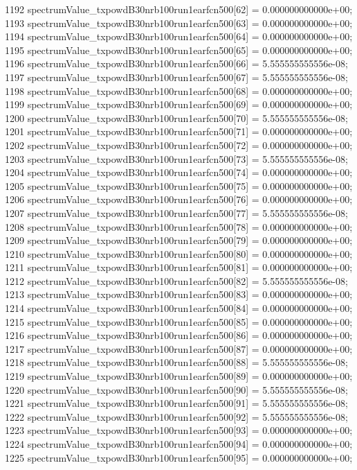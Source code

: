\begin{DoxyCode}
1192   spectrumValue\_txpowdB30nrb100run1earfcn500[62] = 0.000000000000e+00;
1193   spectrumValue\_txpowdB30nrb100run1earfcn500[63] = 0.000000000000e+00;
1194   spectrumValue\_txpowdB30nrb100run1earfcn500[64] = 0.000000000000e+00;
1195   spectrumValue\_txpowdB30nrb100run1earfcn500[65] = 0.000000000000e+00;
1196   spectrumValue\_txpowdB30nrb100run1earfcn500[66] = 5.555555555556e-08;
1197   spectrumValue\_txpowdB30nrb100run1earfcn500[67] = 5.555555555556e-08;
1198   spectrumValue\_txpowdB30nrb100run1earfcn500[68] = 0.000000000000e+00;
1199   spectrumValue\_txpowdB30nrb100run1earfcn500[69] = 0.000000000000e+00;
1200   spectrumValue\_txpowdB30nrb100run1earfcn500[70] = 5.555555555556e-08;
1201   spectrumValue\_txpowdB30nrb100run1earfcn500[71] = 0.000000000000e+00;
1202   spectrumValue\_txpowdB30nrb100run1earfcn500[72] = 0.000000000000e+00;
1203   spectrumValue\_txpowdB30nrb100run1earfcn500[73] = 5.555555555556e-08;
1204   spectrumValue\_txpowdB30nrb100run1earfcn500[74] = 0.000000000000e+00;
1205   spectrumValue\_txpowdB30nrb100run1earfcn500[75] = 0.000000000000e+00;
1206   spectrumValue\_txpowdB30nrb100run1earfcn500[76] = 0.000000000000e+00;
1207   spectrumValue\_txpowdB30nrb100run1earfcn500[77] = 5.555555555556e-08;
1208   spectrumValue\_txpowdB30nrb100run1earfcn500[78] = 0.000000000000e+00;
1209   spectrumValue\_txpowdB30nrb100run1earfcn500[79] = 0.000000000000e+00;
1210   spectrumValue\_txpowdB30nrb100run1earfcn500[80] = 0.000000000000e+00;
1211   spectrumValue\_txpowdB30nrb100run1earfcn500[81] = 0.000000000000e+00;
1212   spectrumValue\_txpowdB30nrb100run1earfcn500[82] = 5.555555555556e-08;
1213   spectrumValue\_txpowdB30nrb100run1earfcn500[83] = 0.000000000000e+00;
1214   spectrumValue\_txpowdB30nrb100run1earfcn500[84] = 0.000000000000e+00;
1215   spectrumValue\_txpowdB30nrb100run1earfcn500[85] = 0.000000000000e+00;
1216   spectrumValue\_txpowdB30nrb100run1earfcn500[86] = 0.000000000000e+00;
1217   spectrumValue\_txpowdB30nrb100run1earfcn500[87] = 0.000000000000e+00;
1218   spectrumValue\_txpowdB30nrb100run1earfcn500[88] = 5.555555555556e-08;
1219   spectrumValue\_txpowdB30nrb100run1earfcn500[89] = 0.000000000000e+00;
1220   spectrumValue\_txpowdB30nrb100run1earfcn500[90] = 5.555555555556e-08;
1221   spectrumValue\_txpowdB30nrb100run1earfcn500[91] = 5.555555555556e-08;
1222   spectrumValue\_txpowdB30nrb100run1earfcn500[92] = 5.555555555556e-08;
1223   spectrumValue\_txpowdB30nrb100run1earfcn500[93] = 0.000000000000e+00;
1224   spectrumValue\_txpowdB30nrb100run1earfcn500[94] = 0.000000000000e+00;
1225   spectrumValue\_txpowdB30nrb100run1earfcn500[95] = 0.000000000000e+00;

\end{DoxyCode}
